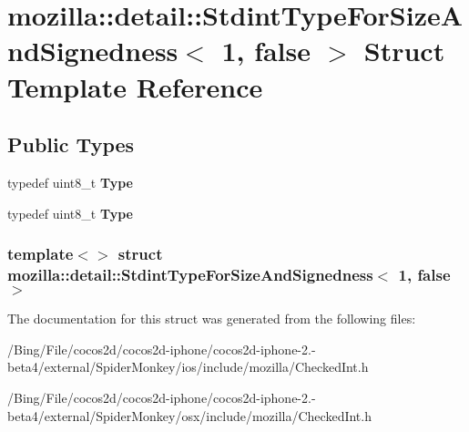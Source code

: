 \hypertarget{structmozilla_1_1detail_1_1_stdint_type_for_size_and_signedness_3_011_00_01false_01_4}{\section{mozilla\-:\-:detail\-:\-:Stdint\-Type\-For\-Size\-And\-Signedness$<$ 1, false $>$ Struct Template Reference}
\label{structmozilla_1_1detail_1_1_stdint_type_for_size_and_signedness_3_011_00_01false_01_4}
}
\subsection*{Public Types}
\begin{DoxyCompactItemize}
\item 
\hypertarget{structmozilla_1_1detail_1_1_stdint_type_for_size_and_signedness_3_011_00_01false_01_4_acac232c98cd8cfcce7935e8886322180}{typedef uint8\-\_\-t {\bfseries Type}}\label{structmozilla_1_1detail_1_1_stdint_type_for_size_and_signedness_3_011_00_01false_01_4_acac232c98cd8cfcce7935e8886322180}

\item 
\hypertarget{structmozilla_1_1detail_1_1_stdint_type_for_size_and_signedness_3_011_00_01false_01_4_acac232c98cd8cfcce7935e8886322180}{typedef uint8\-\_\-t {\bfseries Type}}\label{structmozilla_1_1detail_1_1_stdint_type_for_size_and_signedness_3_011_00_01false_01_4_acac232c98cd8cfcce7935e8886322180}

\end{DoxyCompactItemize}
\subsubsection*{template$<$$>$ struct mozilla\-::detail\-::\-Stdint\-Type\-For\-Size\-And\-Signedness$<$ 1, false $>$}



The documentation for this struct was generated from the following files\-:\begin{DoxyCompactItemize}
\item 
/\-Bing/\-File/cocos2d/cocos2d-\/iphone/cocos2d-\/iphone-\/2.-\/beta4/external/\-Spider\-Monkey/ios/include/mozilla/Checked\-Int.\-h\item 
/\-Bing/\-File/cocos2d/cocos2d-\/iphone/cocos2d-\/iphone-\/2.-\/beta4/external/\-Spider\-Monkey/osx/include/mozilla/Checked\-Int.\-h\end{DoxyCompactItemize}
